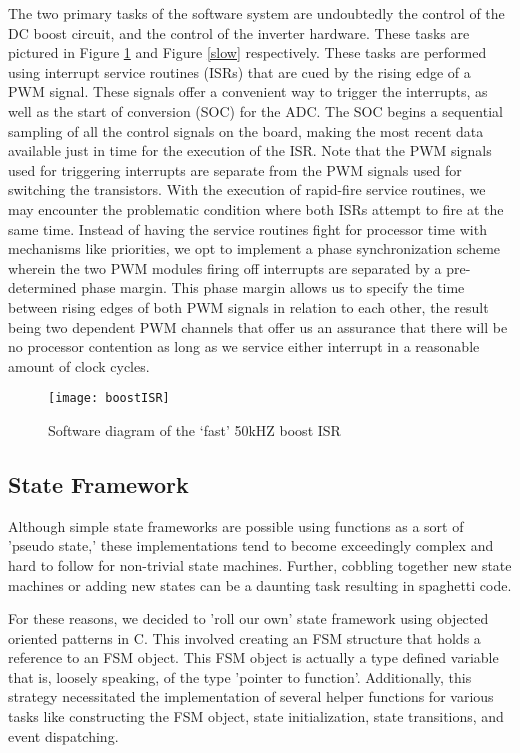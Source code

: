 The two primary tasks of the software system are undoubtedly the control of the DC boost circuit, and the control of the inverter hardware. These tasks are pictured in Figure \ref{fast} and Figure \ref{slow} respectively. These tasks are performed using interrupt service routines (ISRs) that are cued by the rising edge of a PWM signal. These signals offer a convenient way to trigger the interrupts, as well as the start of conversion (SOC) for the ADC. The SOC begins a sequential sampling of all the control signals on the board, making the most recent data available just in time for the execution of the ISR. Note that the PWM signals used for triggering interrupts are separate from the PWM signals used for switching the transistors. With the execution of rapid-fire service routines, we may encounter the problematic condition where both ISRs attempt to fire at the same time. Instead of having the service routines fight for processor time with mechanisms like priorities, we opt to implement a phase synchronization scheme wherein the two PWM modules firing off interrupts are separated by a pre-determined phase margin. This phase margin allows us to specify the time between rising edges of both PWM signals in relation to each other, the result being two dependent PWM channels that offer us an assurance that there will be no processor contention as long as we service either interrupt in a reasonable amount of clock cycles.

\begin{figure}[h]
\begin{center}
\texttt{[image: boostISR]}
\caption{Software diagram of the `fast' 50kHZ boost ISR}
\label{fast}
\end{center}
\end{figure}

\subsection{State Framework}
Although simple state frameworks are possible using functions as a sort of 'pseudo state,' these implementations tend to become exceedingly complex and hard to follow for non-trivial state machines. Further, cobbling together new state machines or adding new states can be a daunting task resulting in spaghetti code. 

For these reasons, we decided to 'roll our own' state framework using objected oriented patterns in C. This involved creating an FSM structure that holds a reference to an FSM object. This FSM object is actually a type defined variable that is, loosely speaking, of the type 'pointer to function'. Additionally, this strategy necessitated the implementation of several helper functions for various tasks like constructing the FSM object, state initialization, state transitions, and event dispatching. 

